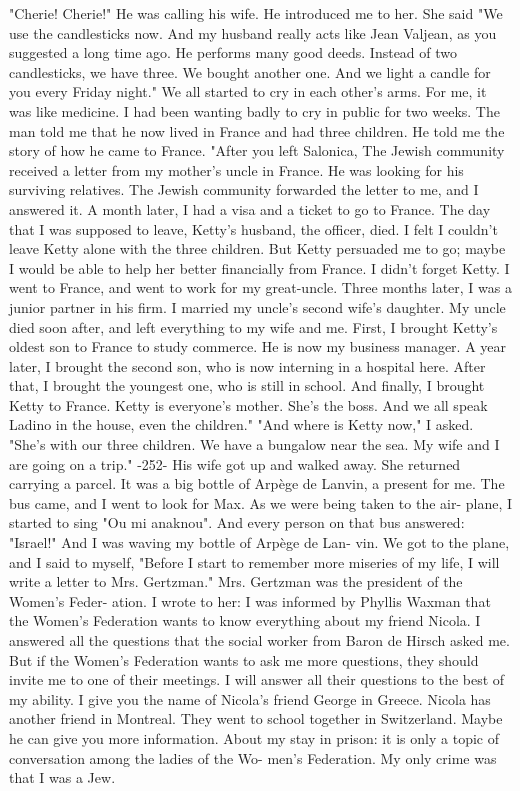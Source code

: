 "Cherie! Cherie!" He was calling his wife. He introduced me to her. 
She said "We use the candlesticks now. And my husband really 
acts like Jean Valjean, as you suggested a long time ago. He performs 
many good deeds. Instead of two candlesticks, we have three. We 
bought another one. And we light a candle for you every Friday night." 
We all started to cry in each other's arms. For me, it was like 
medicine. I had been wanting badly to cry in public for two 
weeks. The man told me that he now lived in France and had three children. He told me the story of how he came to France. 
"After you left Salonica, The Jewish community received a letter 
from my mother's uncle in France. He was looking for his surviving 
relatives. The Jewish community forwarded the letter to me, and I 
answered it. A month later, I had a visa and a ticket to go to France. 
The day that I was supposed to leave, Ketty's husband, the officer, 
died. I felt I couldn't leave Ketty alone with the three children. 
But Ketty persuaded me to go; maybe I would be able to help her better 
financially from France. 
I didn't forget Ketty. I went to France, and went to work for 
my great-uncle. Three months later, I was a junior partner in his 
firm. I married my uncle's second wife's daughter. My uncle died 
soon after, and left everything to my wife and me. First, I brought 
Ketty's oldest son to France to study commerce. He is now my business 
manager. A year later, I brought the second son, who is now interning 
in a hospital here. After that, I brought the youngest one, who is 
still in school. And finally, I brought Ketty to France. Ketty is 
everyone's mother. She's the boss. And we all speak Ladino in the 
house, even the children." 
"And where is Ketty now," I asked. 
"She's with our three children. We have a bungalow near the sea. 
My wife and I are going on a trip." 
-252-
His wife got up and walked away. She returned carrying a parcel. 
It was a big bottle of Arpège de Lanvin, a present for me. The bus 
came, and I went to look for Max. As we were being taken to the air-
plane, I started to sing "Ou mi anaknou". And every person on that 
bus answered: "Israel!" And I was waving my bottle of Arpège de Lan-
vin. 
We got to the plane, and I said to myself, "Before I start to 
remember more miseries of my life, I will write a letter to 
Mrs. Gertzman." Mrs. Gertzman was the president of the Women's Feder-
ation. I wrote to her: 
I was informed by Phyllis Waxman that the Women's 
Federation wants to know everything about my friend Nicola. I answered all the questions that the social 
worker from Baron de Hirsch asked me. But if the Women's Federation wants to ask me more questions, they 
should invite me to one of their meetings. I will answer all their questions to the best of my ability. I 
give you the name of Nicola's friend George in Greece. 
Nicola has another friend in Montreal. They went to 
school together in Switzerland. Maybe he can give you 
more information. About my stay in prison: it is only 
a topic of conversation among the ladies of the Wo-
men's Federation. My only crime was that I was a Jew. 

